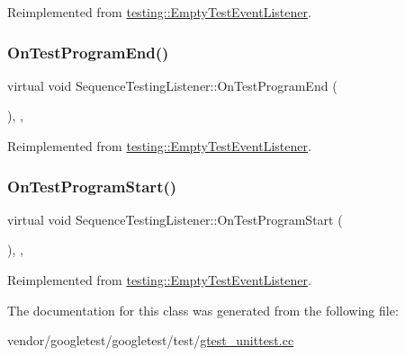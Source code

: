 Reimplemented from \hyperlink{classtesting_1_1_empty_test_event_listener_a836f05829855dc60d13ba99ad712c0dd}{testing\+::\+Empty\+Test\+Event\+Listener}.

\mbox{\label{class_sequence_testing_listener_aacac5e15bac089460841ff63a5c31f57}} 
\subsubsection{\texorpdfstring{On\+Test\+Program\+End()}{OnTestProgramEnd()}}
{\footnotesize\ttfamily virtual void Sequence\+Testing\+Listener\+::\+On\+Test\+Program\+End (\begin{DoxyParamCaption}\item[{const \hyperlink{classtesting_1_1_unit_test}{Unit\+Test} \&}]{ }\end{DoxyParamCaption})\hspace{0.3cm}{\ttfamily [inline]}, {\ttfamily [protected]}, {\ttfamily [virtual]}}



Reimplemented from \hyperlink{classtesting_1_1_empty_test_event_listener_a0abcc02bd2331a2e29ad6f4d9daf2a32}{testing\+::\+Empty\+Test\+Event\+Listener}.

\mbox{\label{class_sequence_testing_listener_a25b96acdbaa6f582e583e6b56bd39b42}} 
\subsubsection{\texorpdfstring{On\+Test\+Program\+Start()}{OnTestProgramStart()}}
{\footnotesize\ttfamily virtual void Sequence\+Testing\+Listener\+::\+On\+Test\+Program\+Start (\begin{DoxyParamCaption}\item[{const \hyperlink{classtesting_1_1_unit_test}{Unit\+Test} \&}]{ }\end{DoxyParamCaption})\hspace{0.3cm}{\ttfamily [inline]}, {\ttfamily [protected]}, {\ttfamily [virtual]}}



Reimplemented from \hyperlink{classtesting_1_1_empty_test_event_listener_aa3847c8a3c22d8d69a6006dfdd6589fc}{testing\+::\+Empty\+Test\+Event\+Listener}.



The documentation for this class was generated from the following file\+:\begin{DoxyCompactItemize}
\item 
vendor/googletest/googletest/test/\hyperlink{gtest__unittest_8cc}{gtest\+\_\+unittest.\+cc}\end{DoxyCompactItemize}
